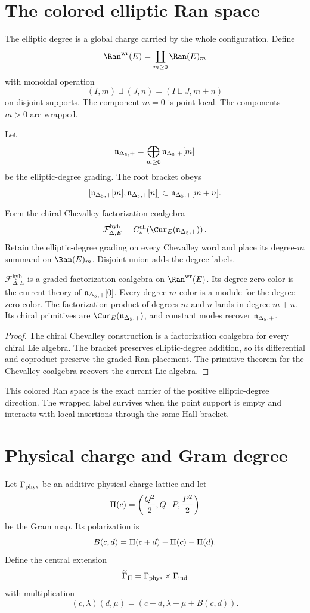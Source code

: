 \chapter{The colored elliptic Ran space}
The elliptic degree is a global charge carried by the whole configuration.  Define
\[
 \Ran^{\mathrm{wr}}(E)=\coprod_{m\ge0}\Ran(E)_m
\]
with monoidal operation
\[
 (I,m)\sqcup(J,n)=(I\sqcup J,m+n)
\]
on disjoint supports.  The component $m=0$ is point-local.  The components $m>0$ are wrapped.

Let
\[
 {\mathfrak n_{\Delta_5,+}}=\bigoplus_{m\ge0}{\mathfrak n_{\Delta_5,+}}[m]
\]
be the elliptic-degree grading.  The root bracket obeys
\[
 [{\mathfrak n_{\Delta_5,+}}[m],{\mathfrak n_{\Delta_5,+}}[n]]\subset{\mathfrak n_{\Delta_5,+}}[m+n].
\]

\begin{construction}
Form the chiral Chevalley factorization coalgebra
\[
 \mathcal F^{\mathrm{hyb}}_{\Delta,E}
 =C_*^{\mathrm{ch}}\!\left(\Cur_E(\nIg)\right).
\]
Retain the elliptic-degree grading on every Chevalley word and place its degree-$m$ summand on $\Ran(E)_m$.  Disjoint union adds the degree labels.
\end{construction}

\begin{theorem}
$\mathcal F^{\mathrm{hyb}}_{\Delta,E}$ is a graded factorization coalgebra on $\Ran^{\mathrm{wr}}(E)$.  Its degree-zero color is the current theory of ${\mathfrak n_{\Delta_5,+}}[0]$.  Every degree-$m$ color is a module for the degree-zero color.  The factorization product of degrees $m$ and $n$ lands in degree $m+n$.  Its chiral primitives are $\Cur_E(\nIg)$, and constant modes recover ${\mathfrak n_{\Delta_5,+}}$.
\end{theorem}
\begin{proof}
The chiral Chevalley construction is a factorization coalgebra for every chiral Lie algebra.  The bracket preserves elliptic-degree addition, so its differential and coproduct preserve the graded Ran placement.  The primitive theorem for the Chevalley coalgebra recovers the current Lie algebra.
\end{proof}

This colored Ran space is the exact carrier of the positive elliptic-degree direction.  The wrapped label survives when the point support is empty and interacts with local insertions through the same Hall bracket.

\chapter{Physical charge and Gram degree}
Let $\Gamma_{\mathrm{phys}}$ be an additive physical charge lattice and let
\[
 \Pi(c)=\left(\frac{Q^2}{2},Q\cdot P,\frac{P^2}{2}\right)
\]
be the Gram map.  Its polarization is
\[
 B(c,d)=\Pi(c+d)-\Pi(c)-\Pi(d).
\]
Define the central extension
\[
 \widetilde\Gamma_\Pi=\Gamma_{\mathrm{phys}}\times\Gamma_{\mathrm{ind}}
\]
with multiplication
\[
 (c,\lambda)(d,\mu)
 =(c+d,\lambda+\mu+B(c,d)).
\]

